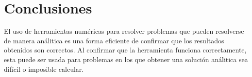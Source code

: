\section{Conclusiones}

El uso de herramientas numéricas para resolver problemas que pueden resolverse de manera análitica es una forma eficiente de confirmar que los resultados obtenidos son correctos. Al confirmar que la herramienta funciona correctamente, esta puede ser usada para problemas en los que obtener una solución análitica sea difícil o imposible calcular.